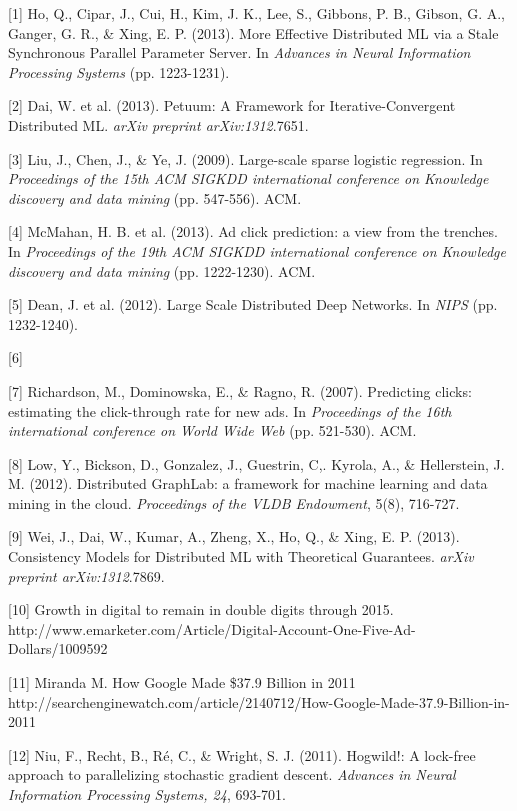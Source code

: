 \documentclass{article} %
\begin{document}
\small{
[1] Ho, Q., Cipar, J., Cui, H., Kim, J. K., Lee, S., Gibbons, P. B., Gibson, G. A., Ganger, G. R., \& Xing, E. P. (2013). More Effective Distributed ML via a Stale Synchronous Parallel Parameter Server. In {\it Advances in Neural Information Processing Systems} (pp. 1223-1231).

[2] Dai, W. et al. (2013). Petuum: A Framework for Iterative-Convergent Distributed ML. {\it arXiv preprint arXiv:1312}.7651.

[3] Liu, J., Chen, J., \& Ye, J. (2009). Large-scale sparse logistic regression. In {\it Proceedings of the 15th ACM SIGKDD international conference on Knowledge discovery and data mining} (pp. 547-556). ACM.

[4] McMahan, H. B. et al. (2013). Ad click prediction: a view from the trenches. In {\it Proceedings of the 19th ACM SIGKDD international conference on Knowledge discovery and data mining} (pp. 1222-1230). ACM.

[5] Dean, J. et al. (2012). Large Scale Distributed Deep Networks. In {\it NIPS} (pp. 1232-1240).

[6]

[7] Richardson, M., Dominowska, E., \& Ragno, R. (2007). Predicting clicks: estimating the click-through rate for new ads. In {\it Proceedings of the 16th international conference on World Wide Web} (pp. 521-530). ACM.

[8] Low, Y., Bickson, D., Gonzalez, J., Guestrin, C,. Kyrola, A., \& Hellerstein, J. M. (2012). Distributed GraphLab: a framework for machine learning and data mining in the cloud. {\it Proceedings of the VLDB Endowment}, 5(8), 716-727.

[9] Wei, J., Dai, W., Kumar, A., Zheng, X., Ho, Q., \& Xing, E. P. (2013). Consistency Models for Distributed ML with Theoretical Guarantees. {\it arXiv preprint arXiv:1312}.7869.

[10] Growth in digital to remain in double digits through 2015. http://www.emarketer.com/Article/Digital-Account-One-Five-Ad-Dollars/1009592

[11] Miranda M. How Google Made \$37.9 Billion in 2011 http://searchenginewatch.com/article/2140712/How-Google-Made-37.9-Billion-in-2011

[12] Niu, F., Recht, B., Ré, C., \& Wright, S. J. (2011). Hogwild!: A lock-free approach to parallelizing stochastic gradient descent. {\it Advances in Neural Information Processing Systems, 24}, 693-701.

}
\end{document}
